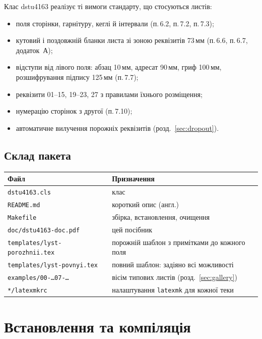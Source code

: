 \documentclass[11pt,a4paper]{article}
\newcommand\pkg[1]{\textsf{#1}}
\newcommand\cls{\pkg{dstu4163}}
\newcommand\cl[1]{п.\,#1}
\begin{document}
Клас \cls{} реалізує ті вимоги стандарту, що стосуються листів:

\begin{itemize}
  \item поля сторінки, гарнітуру, кеглі й інтервали (\cl{6.2}, \cl{7.2}, \cl{7.3});
  \item кутовий і поздовжній бланки листа зі зоною реквізитів 73\,мм
        (\cl{6.6}, \cl{6.7}, додаток~А);
  \item відступи від лівого поля: абзац 10\,мм, адресат 90\,мм, гриф 100\,мм,
        розшифрування підпису 125\,мм (\cl{7.7});
  \item реквізити 01--15, 19--23, 27 з правилами їхнього розміщення;
  \item нумерацію сторінок з другої (\cl{7.10});
  \item автоматичне вилучення порожніх реквізитів (розд.~\ref{sec:dropout}).
\end{itemize}

\subsection{Склад пакета}

\begin{longtable}{@{}L{58mm}L{96mm}@{}}
\toprule
Файл & Призначення \\
\midrule
\endhead
\texttt{dstu4163.cls} & клас \\
\texttt{README.md} & короткий опис (англ.) \\
\texttt{Makefile} & збірка, встановлення, очищення \\
\texttt{doc/dstu4163-doc.pdf} & цей посібник \\
\texttt{templates/lyst-porozhnii.tex} & порожній шаблон з примітками до кожного поля \\
\texttt{templates/lyst-povnyi.tex} & повний шаблон: задіяно всі можливості \\
\texttt{examples/00-…07-…} & вісім типових листів (розд.~\ref{sec:gallery}) \\
\texttt{*/latexmkrc} & налаштування \texttt{latexmk} для кожної теки \\
\bottomrule
\end{longtable}

\section{Встановлення та компіляція}
\end{document}
